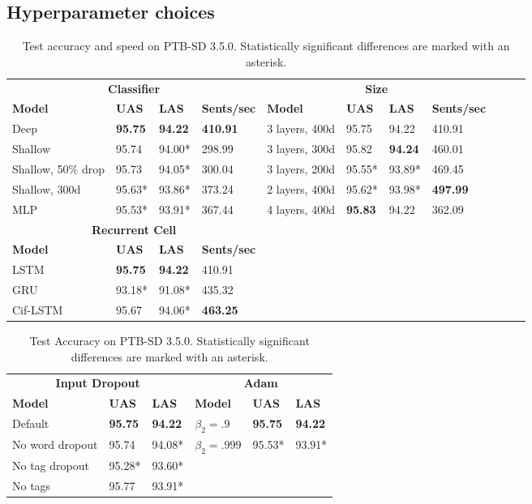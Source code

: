 \documentclass[11pt,a4paper]{article}
\begin{document}
\subsection{Hyperparameter choices}
\begin{table}
  \begin{center}\small
  \begin{tabular}{llll@{\hskip 2em}lllllll}
    \multicolumn{4}{c}{\bf Classifier} & \multicolumn{4}{c}{\bf Size}\\
    \bf Model & \bf UAS & \bf LAS & \bf Sents/sec  & \bf Model & \bf UAS & \bf LAS & \bf Sents/sec \\
    Deep & \bf 95.75 & \bf 94.22 & \bf 410.91      & 3 layers, 400d & 95.75 & 94.22 & 410.91       \\
    Shallow & 95.74 & 94.00* & 298.99              & 3 layers, 300d & 95.82 & \bf 94.24 & 460.01   \\
    Shallow, 50\%{} drop & 95.73 & 94.05* & 300.04 & 3 layers, 200d & 95.55* & 93.89* & 469.45     \\
    Shallow, 300d & 95.63* & 93.86* & 373.24       & 2 layers, 400d & 95.62* & 93.98* & \bf 497.99 \\
    MLP & 95.53* & 93.91* & 367.44                 & 4 layers, 400d & \bf 95.83 & 94.22 & 362.09      \\[2ex]
    \multicolumn{4}{c}{\bf Recurrent Cell}\\
    \bf Model & \bf UAS & \bf LAS & \bf Sents/sec\\
    LSTM & \bf 95.75 & \bf 94.22 & 410.91\\
    GRU & 93.18* & 91.08* & 435.32\\
    Cif-LSTM & 95.67 & 94.06* & \bf 463.25\\
  \end{tabular}
  \end{center}
  \caption{Test accuracy and speed on PTB-SD 3.5.0. Statistically significant differences are marked with an asterisk.}
  \label{Dev results 1}
\end{table}
\begin{table}
  \begin{center}\small
  \begin{tabular}{lll@{\hskip 2em}lll}
    \multicolumn{3}{c}{\bf Input Dropout} & \multicolumn{3}{c}{\bf Adam}\\
    \bf Model & \bf UAS & \bf LAS    & \bf Model & \bf UAS & \bf LAS\\       
    Default & \bf 95.75 & \bf 94.22  & $\beta_2=.9$ & \bf 95.75 & \bf 94.22 \\
    No word dropout & 95.74 & 94.08* & $\beta_2=.999$ & 95.53* & 93.91*\\
    No tag dropout & 95.28* & 93.60* \\
    No tags & 95.77 & 93.91*         
  \end{tabular}
  \end{center}
  \caption{Test Accuracy on PTB-SD 3.5.0. Statistically significant differences are marked with an asterisk.}
  \label{Dev results 2}
\end{table}
\end{document}
